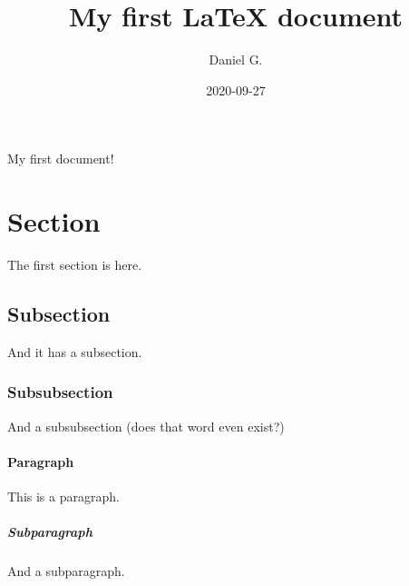 \documentclass{article}  %
\title{My first \LaTeX{} document}
\date{2020-09-27}
\author{Daniel G.}
\begin{document}
   \maketitle  %
   \newpage  %

   My first document!

   \section{Section}  %

   The first section is here.

   \subsection{Subsection}  %

   And it has a subsection.

   \subsubsection{Subsubsection}

   And a subsubsection (does that word even exist?)

   \paragraph{Paragraph}  %

   This is a paragraph.

   \subparagraph{Subparagraph}

   And a subparagraph.
\end{document}
